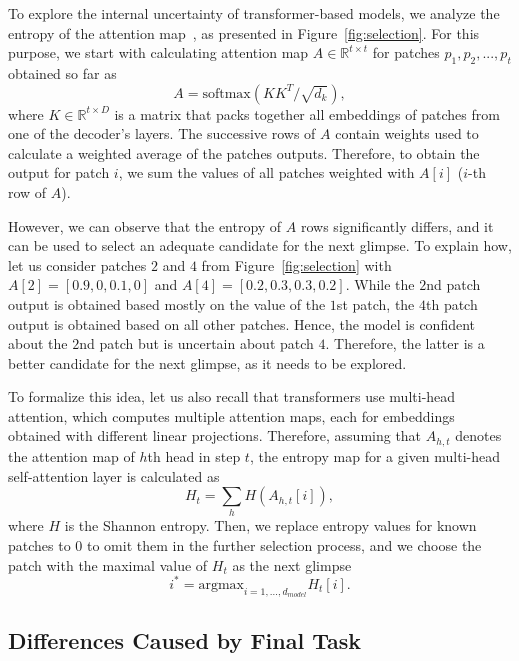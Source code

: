 \documentclass{article}
\begin{document}
To explore the internal uncertainty of transformer-based models, we analyze the entropy of the attention map~\cite{vaswani2017attention}, as presented in Figure~\ref{fig:selection}. For this purpose, we start with calculating attention map $A \in \mathbb{R}^{t \times t}$ for patches $p_1, p_2, ..., p_t$ obtained so far as
\begin{equation}
A = \textrm{softmax}(K K^T / \sqrt{d_k}),
\end{equation}
where $K \in \mathbb{R}^{t \times D}$ is a matrix that packs together all embeddings of patches from one of the decoder's layers.
%
The successive rows of $A$ contain weights used to calculate a weighted average of the patches outputs. Therefore, to obtain the output for patch $i$, we sum the values of all patches weighted with $A[i]$ ($i$-th row of $A$).

However, we can observe that the entropy of $A$ rows significantly differs, and it can be used to select an adequate candidate for the next glimpse. To explain how, let us consider patches $2$ and $4$ from Figure~\ref{fig:selection} with $A[2]=[0.9, 0, 0.1, 0]$ and $A[4]=[0.2, 0.3, 0.3, 0.2]$. While the $2$nd patch output is obtained based mostly on the value of the $1$st patch, the $4$th patch output is obtained based on all other patches. Hence, the model is confident about the $2$nd patch but is uncertain about patch $4$. Therefore, the latter is a better candidate for the next glimpse, as it needs to be explored.

To formalize this idea, let us also recall that transformers use multi-head attention, which computes multiple attention maps, each for embeddings obtained with different linear projections. Therefore, assuming that $A_{h,t}$ denotes the attention map of $h$th head in step $t$, the entropy map for a given multi-head self-attention layer is calculated as
\begin{equation}
H_t = \sum_h H(A_{h,t}[i]),
\label{eq:h_t}
\end{equation}
where $H$ is the Shannon entropy. Then, we replace entropy values for known patches to $0$ to omit them in the further selection process, and we choose the patch with the maximal value of $H_t$ as the next glimpse
\begin{equation}
i^* = \textrm{argmax}_{i=1,\dots,d_{model}} H_t[i].
\end{equation}




\subsection{Differences Caused by Final Task}
\label{sec:finalTask}
\end{document}
